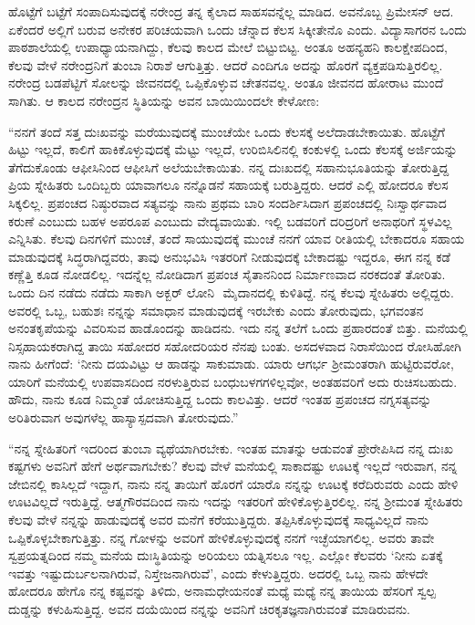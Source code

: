 ಹೊಟ್ಟೆಗೆ ಬಟ್ಟೆಗೆ ಸಂಪಾದಿಸುವುದಕ್ಕೆ ನರೇಂದ್ರ ತನ್ನ ಕೈಲಾದ ಸಾಹಸವನ್ನೆಲ್ಲ ಮಾಡಿದ. ಅವನೊಬ್ಬ ಪ್ರಿಮೇಸನ್ ಆದ. ಏಕೆಂದರೆ ಅಲ್ಲಿಗೆ ಬರುವ ಅನೇಕರ ಪರಿಚಯವಾಗಿ ಒಂದು ಚೆನ್ನಾದ ಕೆಲಸ ಸಿಕ್ಕೀತೇನೊ ಎಂದು. ವಿದ್ಯಾಸಾಗರನ ಒಂದು ಪಾಠಶಾಲೆಯಲ್ಲಿ ಉಪಾಧ್ಯಾಯನಾಗಿದ್ದು, ಕೆಲವು ಕಾಲದ ಮೇಲೆ ಬಿಟ್ಟುಬಿಟ್ಟ. ಅಂತೂ ಅಹನ್ಯಹನಿ ಕಾಲಕ್ಷೇಪದಿಂದ, ಕೆಲವು ವೇಳೆ ನರೇಂದ್ರನಿಗೆ ತುಂಬಾ ನಿರಾಶೆ ಆಗುತ್ತಿತ್ತು. ಆದರೆ ಎಂದಿಗೂ ಅದನ್ನು ಹೊರಗೆ ವ್ಯಕ್ತಪಡಿಸುತ್ತಿರಲಿಲ್ಲ. ನರೇಂದ್ರ ಬಡಪೆಟ್ಟಿಗೆ ಸೋಲನ್ನು ಜೀವನದಲ್ಲಿ ಒಪ್ಪಿಕೊಳ್ಳುವ ಚೇತನವಲ್ಲ. ಅಂತೂ ಜೀವನದ ಹೋರಾಟ ಮುಂದೆ ಸಾಗಿತು. ಆ ಕಾಲದ ನರೇಂದ್ರನ ಸ್ಥಿತಿಯನ್ನು ಅವನ ಬಾಯಿಯಿಂದಲೇ ಕೇಳೋಣ:

“ನನಗೆ ತಂದೆ ಸತ್ತ ದುಃಖವನ್ನು ಮರೆಯುವುದಕ್ಕೆ ಮುಂಚೆಯೇ ಒಂದು ಕೆಲಸಕ್ಕೆ ಅಲೆದಾಡಬೇಕಾಯಿತು. ಹೊಟ್ಟೆಗೆ ಹಿಟ್ಟು ಇಲ್ಲದೆ, ಕಾಲಿಗೆ ಹಾಕಿಕೊಳ್ಳುವುದಕ್ಕೆ ಮೆಟ್ಟು ಇಲ್ಲದೆ, ಉರಿಬಿಸಿಲಿನಲ್ಲಿ ಕಂಕುಳಲ್ಲಿ ಒಂದು ಕೆಲಸಕ್ಕೆ ಅರ್ಜಿಯನ್ನು ತೆಗೆದುಕೊಂಡು ಆಫೀಸಿನಿಂದ ಆಫೀಸಿಗೆ ಅಲೆಯಬೇಕಾಯಿತು. ನನ್ನ ದುಃಖದಲ್ಲಿ ಸಹಾನುಭೂತಿಯನ್ನು ತೋರುತ್ತಿದ್ದ ಪ್ರಿಯ ಸ್ನೇಹಿತರು ಒಂದಿಬ್ಬರು ಯಾವಾಗಲೂ ನನ್ನೊಡನೆ ಸಹಾಯಕ್ಕೆ ಬರುತ್ತಿದ್ದರು. ಆದರೆ ಎಲ್ಲಿ ಹೋದರೂ ಕೆಲಸ ಸಿಕ್ಕಲಿಲ್ಲ. ಪ್ರಪಂಚದ ನಿಷ್ಠುರವಾದ ಸತ್ಯವನ್ನು ನಾನು ಪ್ರಥಮ ಬಾರಿ ಸಂದರ್ಶಿಸಿದಾಗ ಪ್ರಪಂಚದಲ್ಲಿ ನಿಃಸ್ವಾರ್ಥವಾದ ಕರುಣೆ ಎಂಬುದು ಬಹಳ ಅಪರೂಪ ಎಂಬುದು ವೇದ್ಯವಾಯಿತು. ಇಲ್ಲಿ ಬಡವರಿಗೆ ದರಿದ್ರರಿಗೆ ಅನಾಥರಿಗೆ ಸ್ಥಳವಿಲ್ಲ ಎನ್ನಿಸಿತು. ಕೆಲವು ದಿನಗಳಿಗೆ ಮುಂಚೆ, ತಂದೆ ಸಾಯುವುದಕ್ಕೆ ಮುಂಚೆ ನನಗೆ ಯಾವ ರೀತಿಯಲ್ಲಿ ಬೇಕಾದರೂ ಸಹಾಯ ಮಾಡುವುದಕ್ಕೆ ಸಿದ್ಧರಾಗಿದ್ದವರು, ತಾವು ಅನುಭವಿಸಿ ಇತರರಿಗೆ ನೀಡುವುದಕ್ಕೆ ಬೇಕಾದಷ್ಟು ಇದ್ದರೂ, ಈಗ ನನ್ನ ಕಡೆ ಕಣ್ಣೆತ್ತಿ ಕೂಡ ನೋಡಲಿಲ್ಲ. ಇದನ್ನೆಲ್ಲ ನೋಡಿದಾಗ ಪ್ರಪಂಚ ಸೈತಾನನಿಂದ ನಿರ್ಮಾಣವಾದ ನರಕದಂತೆ ತೋರಿತು. ಒಂದು ದಿನ ನಡೆದು ನಡೆದು ಸಾಕಾಗಿ ಅಕ್ಬರ್ ಲೋನಿ ‍ ಮೈದಾನದಲ್ಲಿ ಕುಳಿತಿದ್ದೆ. ನನ್ನ ಕೆಲವು ಸ್ನೇಹಿತರು ಅಲ್ಲಿದ್ದರು. ಅವರಲ್ಲಿ ಒಬ್ಬ, ಬಹುಶಃ ನನ್ನನ್ನು ಸಮಾಧಾನ ಮಾಡುವುದಕ್ಕೆ ಇರಬೇಕು ಎಂದು ತೋರುವುದು, ಭಗವಂತನ ಅನಂತಕೃಪೆಯನ್ನು ವಿವರಿಸುವ ಹಾಡೊಂದನ್ನು ಹಾಡಿದನು. ಇದು ನನ್ನ ತಲೆಗೆ ಒಂದು ಪ್ರಹಾರದಂತೆ ಬಿತ್ತು. ಮನೆಯಲ್ಲಿ ನಿಸ್ಸಹಾಯಕರಾಗಿದ್ದ ತಾಯಿ ಸಹೋದರ ಸಹೋದರಿಯರ ನೆನಪು ಬಂತು. ಅಸದಳವಾದ ನಿರಾಸೆಯಿಂದ ರೋಸಿಹೋಗಿ ನಾನು ಹೀಗೆಂದೆ: ‘ನೀನು ದಯವಿಟ್ಟು ಆ ಹಾಡನ್ನು ಸಾಕುಮಾಡು. ಯಾರು ಆಗರ್ಭ ಶ‍್ರೀಮಂತರಾಗಿ ಹುಟ್ಟಿರುವರೋ, ಯಾರಿಗೆ ಮನೆಯಲ್ಲಿ ಉಪವಾಸದಿಂದ ನರಳುತ್ತಿರುವ ಬಂಧುಬಳಗಗಳಿಲ್ಲವೋ, ಅಂತಹವರಿಗೆ ಅದು ರುಚಿಸಬಹುದು. ಹೌದು, ನಾನು ಕೂಡ ನಿಮ್ಮಂತೆ ಯೋಚಿಸುತ್ತಿದ್ದ ಒಂದು ಕಾಲವಿತ್ತು. ಆದರೆ ಇಂತಹ ಪ್ರಪಂಚದ ನಗ್ನಸತ್ಯವನ್ನು ಅರಿತಿರುವಾಗ ಅವುಗಳೆಲ್ಲ ಹಾಸ್ಯಾಸ್ಪದವಾಗಿ ತೋರುವುದು.”

“ನನ್ನ ಸ್ನೇಹಿತರಿಗೆ ಇದರಿಂದ ತುಂಬಾ ವ್ಯಥೆಯಾಗಿರಬೇಕು. ಇಂತಹ ಮಾತನ್ನು ಆಡುವಂತೆ ಪ್ರೇರೇಪಿಸಿದ ನನ್ನ ದುಃಖ ಕಷ್ಟಗಳು ಅವನಿಗೆ ಹೇಗೆ ಅರ್ಥವಾಗಬೇಕು? ಕೆಲವು ವೇಳೆ ಮನೆಯಲ್ಲಿ ಸಾಕಾದಷ್ಟು ಊಟಕ್ಕೆ ಇಲ್ಲದೆ ಇರುವಾಗ, ನನ್ನ ಜೇಬಿನಲ್ಲಿ ಕಾಸಿಲ್ಲದೆ ಇದ್ದಾಗ, ನಾನು ನನ್ನ ತಾಯಿಗೆ ಹೊರಗೆ ಯಾರೊ ನನ್ನನ್ನು ಊಟಕ್ಕೆ ಕರೆದಿರುವರು ಎಂದು ಹೇಳಿ ಊಟವಿಲ್ಲದೆ ಇರುತ್ತಿದ್ದೆ. ಆತ್ಮಗೌರವದಿಂದ ನಾನು ಇದನ್ನು ಇತರರಿಗೆ ಹೇಳಿಕೊಳ್ಳುತ್ತಿರಲಿಲ್ಲ. ನನ್ನ ಶ‍್ರೀಮಂತ ಸ್ನೇಹಿತರು ಕೆಲವು ವೇಳೆ ನನ್ನನ್ನು ಹಾಡುವುದಕ್ಕೆ ಅವರ ಮನೆಗೆ ಕರೆಯುತ್ತಿದ್ದರು. ತಪ್ಪಿಸಿಕೊಳ್ಳುವುದಕ್ಕೆ ಸಾಧ್ಯವಿಲ್ಲದೆ ನಾನು ಒಪ್ಪಿಕೊಳ್ಳಬೇಕಾಗುತ್ತಿತ್ತು. ನನ್ನ ಗೋಳನ್ನು ಅವರಿಗೆ ಹೇಳಿಕೊಳ್ಳುವುದಕ್ಕೆ ನನಗೆ ಇಚ್ಛೆಯಾಗಲಿಲ್ಲ. ಅವರು ತಾವೇ ಸ್ವಪ್ರಯತ್ನದಿಂದ ನಮ್ಮ ಮನೆಯ ದುಃಸ್ಥಿತಿಯನ್ನು ಅರಿಯಲು ಯತ್ನಿಸಲೂ ಇಲ್ಲ. ಎಲ್ಲೋ ಕೆಲವರು ‘ನೀನು ಏತಕ್ಕೆ ಇವತ್ತು ಇಷ್ಟು\break ದುರ್ಬಲನಾಗಿರುವೆ, ನಿಸ್ತೇಜನಾಗಿರುವೆ’, ಎಂದು ಕೇಳುತ್ತಿದ್ದರು. ಅದರಲ್ಲಿ ಒಬ್ಬ ನಾನು ಹೇಳದೇ ಹೋದರೂ ಹೇಗೊ ನನ್ನ ಕಷ್ಟವನ್ನು ತಿಳಿದು, ಅನಾಮಧೇಯನಂತೆ ಮಧ್ಯೆ ಮಧ್ಯೆ ನನ್ನ ತಾಯಿಯ ಹೆಸರಿಗೆ ಸ್ವಲ್ಪ ದುಡ್ಡನ್ನು ಕಳುಹಿಸುತ್ತಿದ್ದ. ಅವನ ದಯೆಯಿಂದ ನನ್ನನ್ನು ಅವನಿಗೆ ಚಿರಕೃತಜ್ಞನಾಗಿರುವಂತೆ ಮಾಡಿರುವನು.

